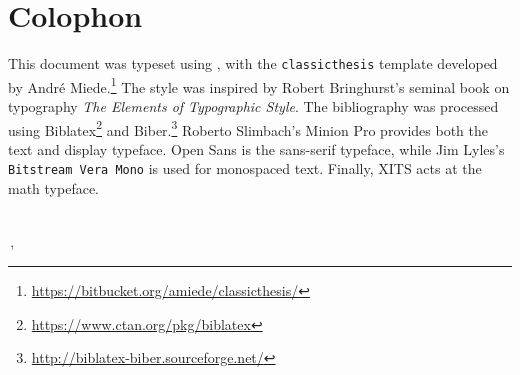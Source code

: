 \pagestyle{empty}

\hfill

\vfill


\section*{Colophon}
This document was typeset using \XeLaTeX, with the
\texttt{classicthesis} template developed by André Miede.\footnote{\url{https://bitbucket.org/amiede/classicthesis/}}
The style was inspired by Robert Bringhurst's seminal book on typography
\emph{The Elements of Typographic Style}.\autocite{Bringhurst2004-wn}
The bibliography was processed using
Biblatex\footnote{\url{https://www.ctan.org/pkg/biblatex}} and
Biber.\footnote{\url{http://biblatex-biber.sourceforge.net/}}
Roberto Slimbach's Minion Pro provides both the text and display typeface.
\textsf{Open Sans} is the sans-serif typeface, while Jim Lyles's
\texttt{Bitstream Vera Mono} is used for monospaced text.
Finally, XITS acts at the math typeface.

\bigskip
{\small
\noindent\textit{\myTitle}
\\
\noindent\textcopyright\,\finalVersion, \myName
}

%
%




